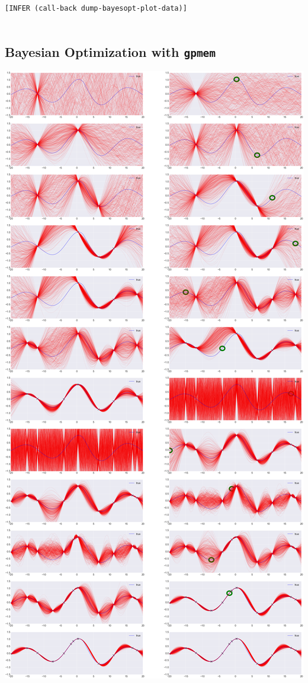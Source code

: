 \documentclass[a0,portrait]{a0poster}
\begin{document}
\begin{multicols}{2}
\begin{minipage}{\linewidth}
\begin{lstlisting}[frame=single,label=alg:structureVent,caption=Venture Code for Bayesian Optimization,mathescape]
[INFER (call-back dump-bayesopt-plot-data)]


\end{lstlisting}
\end{minipage}

\subsection*{Bayesian Optimization with {\tt gpmem}}
\begin{table} %
\includegraphics[width=20cm]{BayesOpt_gpmem_sequence.png}
\end{table}


\end{multicols}
\end{document}
